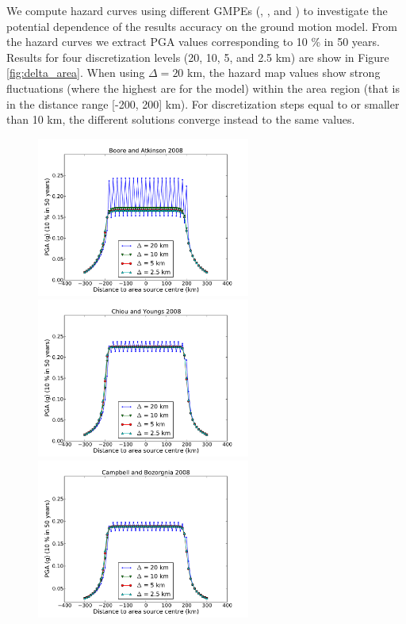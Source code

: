 We compute hazard curves using different GMPEs (\cite{boore2008}, \cite{chiou2008}, \cite{campbell2008} and \cite{abrahamson2008}) to investigate the potential dependence of the results accuracy on the ground motion model. From the hazard curves we extract PGA values corresponding to 10 \% in 50 years. Results for four discretization levels (20, 10, 5, and 2.5 km) are show in
Figure \ref{fig:delta_area}. When using $\Delta=20$ km, the hazard map values show strong fluctuations
 (where the highest are for the \cite{boore2008} model) within the area region (that is in the distance
range [-200, 200] km). For discretization steps equal to or smaller than 10 km, the different solutions converge instead to the same values.
\begin{figure}
\centering
\includegraphics[width=7cm]{./Pictures/PGA_0pt1_source_model_a5_BA2008.pdf}
\includegraphics[width=7cm]{./Pictures/PGA_0pt1_source_model_a5_CY2008.pdf}
\includegraphics[width=7cm]{./Pictures/PGA_0pt1_source_model_a5_CB2008.pdf}

\end{figure}
